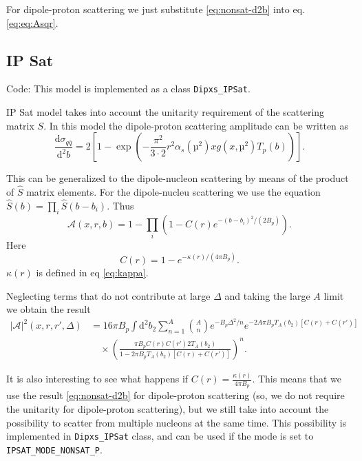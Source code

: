 \documentclass[a4paper,12pt]{article}
\newcommand{\code}[1]{\texttt{#1}}
\newcommand{\der}{\mathrm{d}}
\newcommand{\A}{\mathcal{A}}
\begin{document}
For dipole-proton scattering we just substitute \eqref{eq:nonsat-d2b} into eq. \eqref{eq:eq:Asqr}.

\subsection{IP Sat}
\label{ipsat}
Code: This model is implemented as a class \code{Dipxs\_IPSat}.

IP Sat model takes into account the unitarity requirement of the scattering matrix $S$. In this model the dipole-proton scattering amplitude can be written as \cite{PhysRevD.68.114005}
\begin{equation}
	\label{ipsat-d2b}
	\frac{\der \sigma_{q\bar q}}{\der^2 b} = 2\left[1- \exp \left(-\frac{\pi^2}{3\cdot 2}r^2 \alpha_s(µ^2)xg(x,µ^2) T_p(b)\right) \right].
\end{equation}

This can be generalized to the dipole-nucleon scattering by means of the product of $\hat S$ matrix elements.
For the dipole-nucleu scattering we use the equation $\hat S(b) = \prod_i \hat S(b-b_i)$. Thus
\begin{equation}
	\label{eq:ipsat-a}
	\A(x,r,b) = 1 - \prod_i \left( 1-C(r)e^{-(b-b_i)^2/(2B_p)} \right).
\end{equation}
Here
\begin{equation}
	C(r) = 1-e^{-\kappa(r)/(4\pi B_p)}.
\end{equation}
$\kappa(r)$ is defined in eq \eqref{eq:kappa}.

Neglecting terms that do not contribute at large $\Delta$ and taking the large $A$ limit we obtain the result
\begin{equation}
\label{eq:ipsat-asqr}
\begin{split}
	|\A|^2(x,r,r',\Delta) &= 16\pi B_p \int \der^2 b_2 \sum_{n=1}^A \binom{A}{n} e^{-B_p \Delta^2/n} e^{-2A\pi B_p T_A(b_2)[C(r)+C(r')]} \\
	&\quad \times \left(\frac{\pi B_p C(r)C(r') 2 T_A(b_2)}{1-2\pi B_p T_A(b_2)[C(r)+C(r')]}\right)^n.
\end{split}
\end{equation}

It is also interesting to see what happens if $C(r)=\frac{\kappa(r)}{4\pi B_p}$. This means that we use the result \eqref{eq:nonsat-d2b} for dipole-proton scattering (so, we do not require the unitarity for dipole-proton scattering), but we still take into account the possibility to scatter from multiple nucleons at the same time. This possibility is implemented in \code{Dipxs\_IPSat} class, and can be used if the mode is set to \code{IPSAT\_MODE\_NONSAT\_P}.
\end{document}
